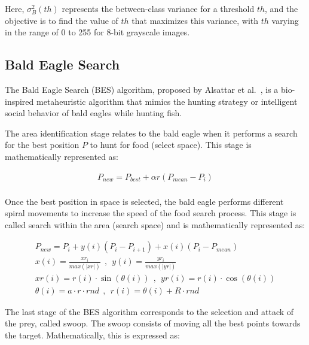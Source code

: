 \documentclass{elsarticle}
\begin{document}
\noindent Here, $\sigma_B^2(th)$ represents the between-class variance for a threshold $th$, and the objective is to find the value of $th$ that maximizes this variance, with $th$ varying in the range of 0 to 255 for 8-bit grayscale images.

\subsection{Bald Eagle Search}

\noindent The Bald Eagle Search (BES) algorithm, proposed by Alsattar et al.~\cite{Alsattar2019}, is a bio-inspired metaheuristic algorithm that mimics the hunting strategy or intelligent social behavior of bald eagles while hunting fish.

\noindent The area identification stage relates to the bald eagle when it performs a search for the best position $P$ to hunt for food (select space). This stage is mathematically represented as:

\begin{equation}
\begin{gathered}
P_{new}=P_{best}+{\alpha}r(P_{mean}-P_{i})\\
\end{gathered}
\label{eq11}
\end{equation}

\noindent Once the best position in space is selected, the bald eagle performs different spiral movements to increase the speed of the food search process. This stage is called search within the area (search space) and is mathematically represented as:

\begin{equation}
\begin{gathered}
P_{new}=P_{i}+y(i)(P_{i}-P_{i+1})+x(i)(P_{i}-P_{mean}) \\
x(i)= \frac{xr_{i}}{max(\lvert xr \rvert)} ~\ , ~\ y(i)= \frac{yr_{i}}{max(\lvert yr \rvert)} \\
xr(i)=r(i)\cdot \sin (\theta(i)) ~\ , ~\ yr(i)=r(i)\cdot \cos (\theta(i)) \\
\theta(i)=a\cdot r\cdot rnd ~\ , ~\ r(i)=\theta(i)+R \cdot rnd 
\end{gathered}
\label{eq12}
\end{equation}

\noindent The last stage of the BES algorithm corresponds to the selection and attack of the prey, called swoop. The swoop consists of moving all the best points towards the target. Mathematically, this is expressed as:
\end{document}
